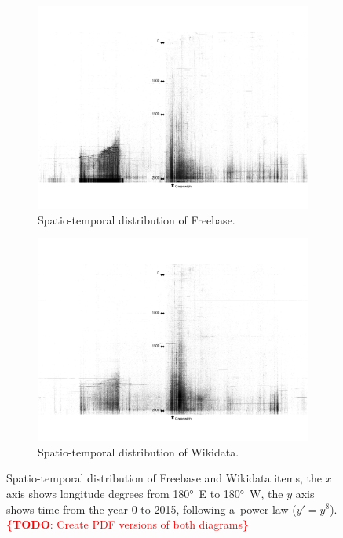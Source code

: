 \documentclass{acm_proc_article-sp}
\newcommand{\todo}[1]{\noindent\textcolor{red}{{\bf \{TODO}: #1{\bf \}}}}
\begin{document}
\begin{figure}[!htbp]
    \centering
    \begin{subfigure}[b]{1.0\columnwidth}
        \includegraphics[width=\textwidth]{img/freebase-time-space.png}
        \caption{Spatio-temporal distribution of Freebase.}
        \label{fig:freebase}
    \end{subfigure}
    \begin{subfigure}[b]{1.0\columnwidth}
        \includegraphics[width=\textwidth]{img/wikidata-time-space.png}
        \caption{Spatio-temporal distribution of Wikidata.}
        \label{fig:wikidata}
    \end{subfigure}
    \caption{Spatio-temporal distribution of Freebase and Wikidata items,
      the $x$ axis shows longitude degrees from 180°~E to 180°~W, the $y$ axis shows time
      from the year 0 to 2015, following a~power law ($y' = y^8$). \todo{Create PDF versions of both diagrams}}
    \label{fig:time-space}
\end{figure}
\end{document}
